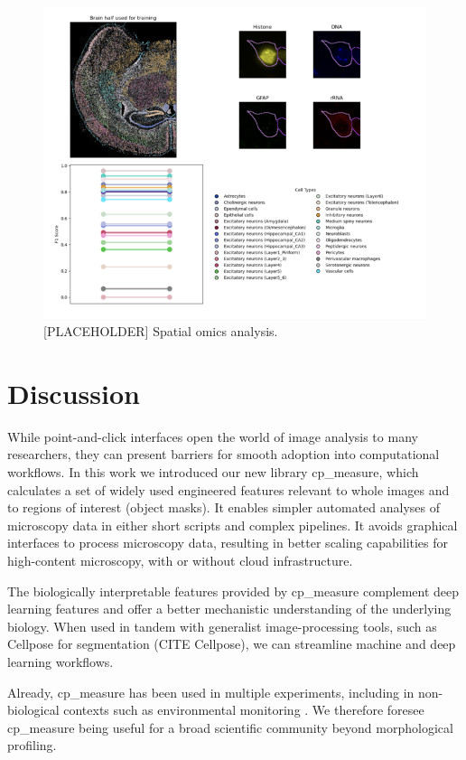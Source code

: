\documentclass{article}
\begin{document}
\begin{figure}[htbp]
\centering
\includegraphics[width=.9\linewidth]{./figs/spatial.png}
\caption{\label{fig:spatial_omics}{[}PLACEHOLDER] Spatial omics analysis.}
\end{figure}
\section{Discussion}
\label{sec:orgf37b369}
While point-and-click interfaces open the world of image analysis to many researchers, they can present barriers for smooth adoption into computational workflows. In this work we introduced our new library cp\_measure, which calculates a set of widely used engineered features relevant to whole images and to regions of interest (object masks). It enables simpler automated analyses of microscopy data in either short scripts and complex pipelines. It avoids graphical interfaces to process microscopy data, resulting in better scaling capabilities for high-content microscopy, with or without cloud infrastructure.

The biologically interpretable features provided by cp\_measure complement deep learning features and offer a better mechanistic understanding of the underlying biology. When used in tandem with generalist image-processing tools, such as Cellpose for segmentation (CITE Cellpose), we can streamline machine and deep learning workflows. 

Already, cp\_measure  has been used in multiple experiments, including in non-biological contexts such as environmental monitoring \citep{ideharaExploringNileRed2025}. We therefore foresee cp\_measure being useful for a broad scientific community beyond morphological profiling.
\end{document}
